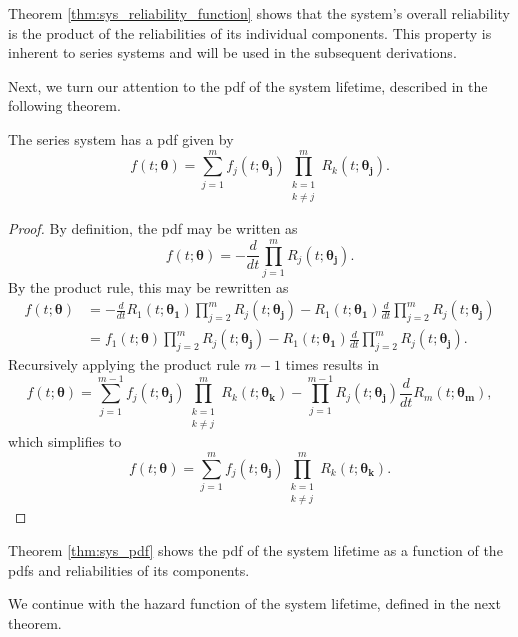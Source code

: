 \documentclass[
]{article}
\begin{document}
Theorem \ref{thm:sys_reliability_function} shows that the system's
overall reliability is the product of the reliabilities of its
individual components. This property is inherent to series systems and
will be used in the subsequent derivations.

Next, we turn our attention to the pdf of the system lifetime, described
in the following theorem.

\begin{theorem}
\label{thm:sys_pdf}
The series system has a pdf given by
\begin{equation}
\label{eq:sys_pdf}
f(t;\boldsymbol{\theta}) = \sum_{j=1}^m f_j(t;\boldsymbol{\theta_j})
    \prod_{\substack{k=1\\k\neq j}}^m R_k(t;\boldsymbol{\theta_j}).
\end{equation}
\end{theorem}
\begin{proof}
By definition, the pdf may be written as
$$
    f(t;\boldsymbol{\theta}) = -\frac{d}{dt} \prod_{j=1}^m R_j(t;\boldsymbol{\theta_j}).
$$
By the product rule, this may be rewritten as
\begin{align*}
  f(t;\boldsymbol{\theta})
    &= -\frac{d}{dt} R_1(t;\boldsymbol{\theta_1})\prod_{j=2}^m R_j(t;\boldsymbol{\theta_j}) -
      R_1(t;\boldsymbol{\theta_1}) \frac{d}{dt} \prod_{j=2}^m R_j(t;\boldsymbol{\theta_j})\\
    &= f_1(t;\boldsymbol{\theta}) \prod_{j=2}^m R_j(t;\boldsymbol{\theta_j}) -
      R_1(t;\boldsymbol{\theta_1}) \frac{d}{dt} \prod_{j=2}^m R_j(t;\boldsymbol{\theta_j}).
\end{align*}
Recursively applying the product rule $m-1$ times results in
$$
f(t;\boldsymbol{\theta}) = \sum_{j=1}^{m-1} f_j(t;\boldsymbol{\theta_j})
    \prod_{\substack{k=1\\k \neq j}}^m R_k(t;\boldsymbol{\theta_k}) -
    \prod_{j=1}^{m-1} R_j(t;\boldsymbol{\theta_j}) \frac{d}{dt} R_m(t;\boldsymbol{\theta_m}),
$$
which simplifies to
$$
f(t;\boldsymbol{\theta})= \sum_{j=1}^m f_j(t;\boldsymbol{\theta_j})
    \prod_{\substack{k=1\\k \neq j}}^m R_k(t;\boldsymbol{\theta_k}).
$$
\end{proof}

Theorem \ref{thm:sys_pdf} shows the pdf of the system lifetime as a
function of the pdfs and reliabilities of its components.

We continue with the hazard function of the system lifetime, defined in
the next theorem.
\end{document}
